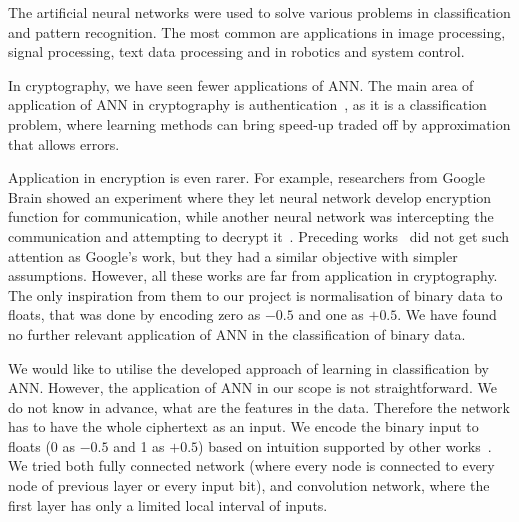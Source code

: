 \documentclass[
  print, %
  Table,   %
  nolof,     %
  nolot,     %
  11pt, %
  oneside  %
]{fithesis3}
\newcommand{\todo}[1]{TODO: \textit{#1}}
\begin{document}
The artificial neural networks were used to solve various problems in classification and pattern recognition. The most common are applications in image processing, signal processing, text data processing and in robotics and system control.

In cryptography, we have seen fewer applications of ANN. The main area of application of ANN in cryptography is authentication~\cite{li2001remote}, as it is a classification problem, where learning methods can bring speed-up traded off by approximation that allows errors.

Application in encryption is even rarer. For example, researchers from Google Brain showed an experiment where they let neural network develop encryption function for communication, while another neural network was intercepting the communication and attempting to decrypt it~\cite{abadi2016learning}. Preceding works~\cite{shihab2006backpropagation, volna2012cryptography} did not get such attention as Google's work, but they had a similar objective with simpler assumptions. However, all these works are far from application in cryptography. The only inspiration from them to our project is normalisation of binary data to floats, that was done by encoding zero as $-0.5$ and one as $+0.5$. We have found no further relevant application of ANN in the classification of binary data.

We would like to utilise the developed approach of learning in classification by ANN. However, the application of ANN in our scope is not straightforward. We do not know in advance, what are the features in the data. Therefore the network has to have the whole ciphertext as an input. We encode the binary input to floats (0 as $-0.5$ and 1 as $+0.5$) based on intuition supported by other works~\cite{abadi2016learning,shihab2006backpropagation}. We tried both fully connected network (where every node is connected to every node of previous layer or every input bit), and convolution network, where the first layer has only a limited local interval of inputs. 


\end{document}
